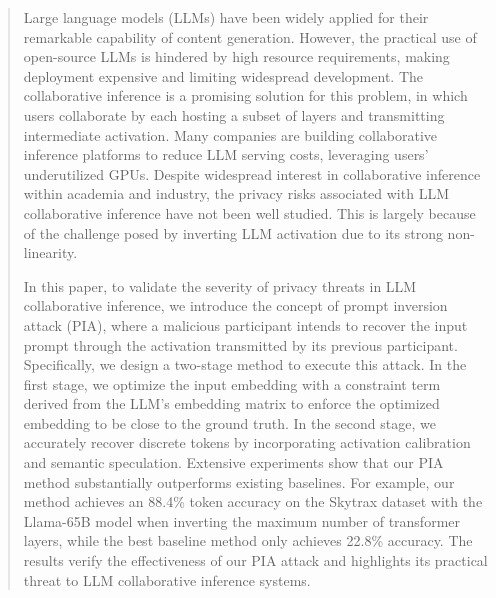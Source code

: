 \begin{abstract}
Large language models (LLMs) have been widely applied for their remarkable capability of content generation. However, the practical use of open-source LLMs is hindered by high resource requirements, making deployment expensive and limiting widespread development. The collaborative inference is a promising solution for this problem, in which users collaborate by each hosting a subset of layers and transmitting intermediate activation. Many companies are building collaborative inference platforms to reduce LLM serving costs, leveraging users' underutilized GPUs. Despite widespread interest in collaborative inference within academia and industry, the privacy risks associated with LLM collaborative inference have not been well studied. This is largely because of the challenge posed by inverting LLM activation due to its strong non-linearity.



In this paper, to validate the severity of privacy threats in LLM collaborative inference, we introduce the concept of prompt inversion attack (PIA),  where a malicious participant intends to recover the input prompt through the activation transmitted by its previous participant. Specifically, we design a two-stage method to execute this attack. In the first stage, we optimize the input embedding with a constraint term derived from the LLM's embedding matrix to enforce the optimized embedding to be close to the ground truth. In the second stage, we accurately recover discrete tokens by incorporating activation calibration and semantic speculation.  Extensive experiments show that our PIA method substantially outperforms existing baselines. For example, our method achieves an 88.4\% token accuracy on the Skytrax dataset with the Llama-65B model when inverting the maximum number of transformer layers, while the best baseline method only achieves 22.8\% accuracy. The results verify the effectiveness of our PIA attack and highlights its practical threat to LLM collaborative inference systems.



\end{abstract}